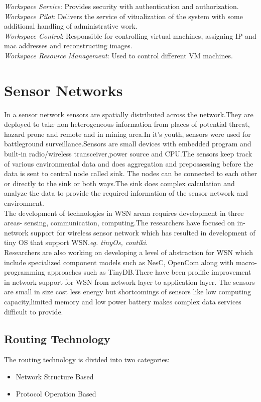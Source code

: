 \documentclass {report}
\begin{document}
\emph{Workspace Service}: Provides security with authentication and authorization.\\
\emph{Workspace Pilot}: Delivers the service of vitualization of the system with some additional handling of administrative work.\\
\emph{Workspace Control}: Responsible for controlling virtual machines, assigning IP and mac addresses and reconstructing images.\\
\emph{Workspace Resource Management}: Used to control different VM machines.\\


\section{Sensor Networks}
In a sensor network sensors are spatially distributed across the network.They are deployed to take non heterogeneous information from places of potential threat, hazard prone and remote and in mining area.In it's youth, sensors were used
for battleground surveillance.Sensors are small devices with embedded program and built-in radio/wireless transceiver,power source and CPU.The sensors keep track of various environmental data
and does aggregation and prepossessing before the data is sent to central node called sink. The nodes can be connected to each other or directly to the sink or both ways.The sink does complex calculation and analyze the data to 
provide the required information of the sensor network and environment.\\
\indent The development of technologies in WSN arena requires development in three areas- sensing, communication,  computing.The researchers have focused on in-network support for wireless sensor network which has resulted in development 
of tiny OS that support WSN.\emph{eg. tinyOs, contiki}.\\
\indent Researchers are also working on developing a level of abstraction for WSN which include specialized component models such as NesC, OpenCom along with macro-programming approaches
such as TinyDB.There have been prolific improvement in network support for WSN from network layer to application layer.
The sensors are small in size cost less energy but shortcomings of sensors like low computing capacity,limited memory and low power battery makes complex data services difficult to provide.\\


\subsection{Routing Technology}
The routing technology is divided into two categories:
\begin{itemize}
\item Network Structure Based 
\item Protocol Operation Based
\end{itemize}
\end{document}
